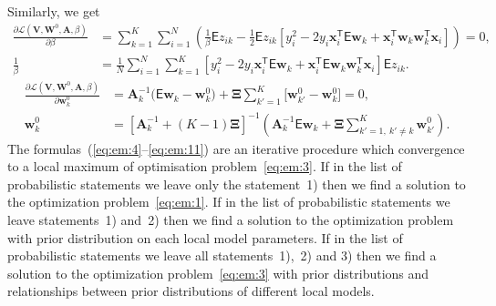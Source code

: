 \documentclass[12pt, twoside]{article}
\begin{document}
Similarly, we get
\[
\label{eq:em:10}
\begin{aligned}
\frac{\partial \mathcal{L}\left(\textbf{V}, \textbf{W}^{0}, \textbf{A}, \beta\right)}{\partial \beta} &= \sum_{k=1}^{K}\sum_{i=1}^{N}\left(\frac{1}{\beta}\mathsf{E}z_{ik}-\frac{1}{2}\mathsf{E}z_{ik}\left[y_{i}^{2}-2y_{i}\textbf{x}_{i}^{\mathsf{T}}\mathsf{E}\textbf{w}_{k}+\textbf{x}_{i}^{\mathsf{T}}\textbf{w}_{k}\textbf{w}_{k}^{\mathsf{T}}\textbf{x}_{i}\right]\right) = 0,\\
\frac{1}{\beta}&=\frac{1}{N}\sum_{i=1}^{N}\sum_{k=1}^{K}\left[y_{i}^{2}-2y_{i}\textbf{x}_{i}^{\mathsf{T}}\mathsf{E}\textbf{w}_{k} + \textbf{x}_{i}^{\mathsf{T}}\mathsf{E}\textbf{w}_{k}\textbf{w}_{k}^{\mathsf{T}}\textbf{x}_{i}\right]\mathsf{E}z_{ik}.
\end{aligned}
\]
\[
\label{eq:em:11}
\begin{aligned}
\frac{\partial \mathcal{L}\left(\textbf{V}, \textbf{W}^{0}, \textbf{A}, \beta\right)}{\partial \mathbf{w}_k^0} &= \mathbf{A}_k^{-1}\bigr(\mathsf{E}\mathbf{w}_k - \mathbf{w}_{k}^{0}\bigr) + \bm{\Xi}\sum_{k'=1}^{K}\bigr[\mathbf{w}_{k'}^{0} -\mathbf{w}_{k}^{0}\bigr] = 0,\\
\textbf{w}_{k}^{0} &=\left[\textbf{A}_{k}^{-1}+\left(K-1\right)\bm{\Xi}\right]^{-1}\left(\textbf{A}^{-1}_{k}\mathsf{E}\textbf{w}_{k}+\bm{\Xi}\sum_{k'=1,~k'\not=k}^{K}\textbf{w}_{k'}^{0}\right).
\end{aligned}
\]
The formulas~(\ref{eq:em:4}--\ref{eq:em:11}) are an iterative procedure which convergence to a local maximum of optimisation problem~\eqref{eq:em:3}.
If in the list of probabilistic statements we leave only the statement~1) then we find a solution to the optimization problem~\eqref{eq:em:1}.
If in the list of probabilistic statements we leave statements~1) and~2) then we find a solution to the optimization problem with prior distribution on each local model parameters.
If in the list of probabilistic statements we leave all statements~1),~2) and 3) then we find a solution to the optimization problem~\eqref{eq:em:3} with prior distributions and relationships between prior distributions of different local models.
\end{document}

